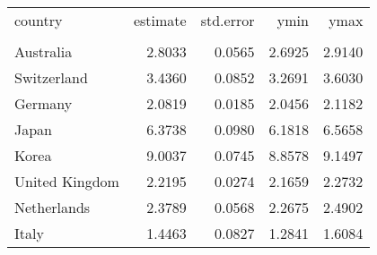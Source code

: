 \begin{tabular}{lrrrr}
   \toprule 
 
country & estimate & std.error & ymin & ymax \\ 

\cmidrule(lr){1-5} 
 
\\[-1.8ex]  
 
Australia & 2.8033 & 0.0565 & 2.6925 & 2.9140 \\ 
  Switzerland & 3.4360 & 0.0852 & 3.2691 & 3.6030 \\ 
  Germany & 2.0819 & 0.0185 & 2.0456 & 2.1182 \\ 
  Japan & 6.3738 & 0.0980 & 6.1818 & 6.5658 \\ 
  Korea & 9.0037 & 0.0745 & 8.8578 & 9.1497 \\ 
  United Kingdom & 2.2195 & 0.0274 & 2.1659 & 2.2732 \\ 
  Netherlands & 2.3789 & 0.0568 & 2.2675 & 2.4902 \\ 
  Italy & 1.4463 & 0.0827 & 1.2841 & 1.6084 \\ 
   \bottomrule  
\end{tabular}
